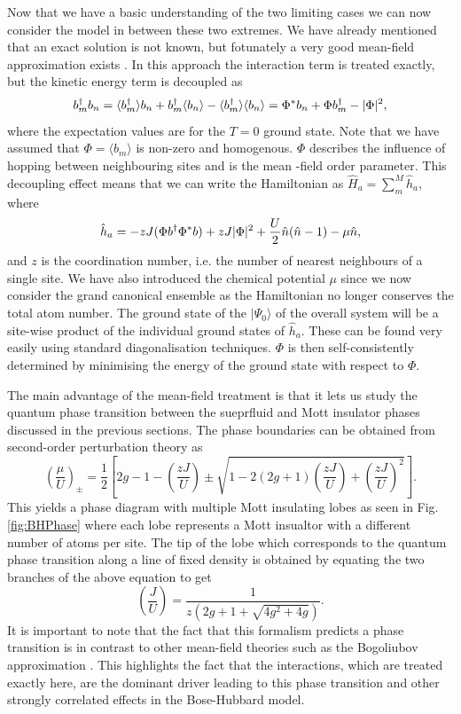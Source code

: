 Now that we have a basic understanding of the two limiting cases we
can now consider the model in between these two extremes. We have
already mentioned that an exact solution is not known, but fotunately
a very good mean-field approximation exists \cite{fisher1989}. In this
approach the interaction term is treated exactly, but the kinetic
energy term is decoupled as
\begin{equation}
  b^\dagger_m b_n = \langle b^\dagger_m \rangle b_n + b^\dagger_m \langle b_n \rangle -
  \langle b^\dagger_m \rangle \langle b_n \rangle = \Phi^* b_n + \Phi b^\dagger_m
  - | \Phi |^2,
\end{equation}
where the expectation values are for the $T = 0$ ground state. Note
that we have assumed that $\Phi = \langle b_m \rangle $ is non-zero
and homogenous. $\Phi$ describes the influence of hopping between
neighbouring sites and is the mean -field order parameter. This
decoupling effect means that we can write the Hamiltonian as $\hat{H}_a
= \sum_m^M \hat{h}_a$, where
\begin{equation}
  \hat{h}_a = -z J ( \Phi b^\dagger \Phi^* b) + z J | \Phi |^2 + \frac{U}{2}
  \hat{n} (\hat{n} - 1) - \mu \hat{n},
\end{equation}
and $z$ is the coordination number, i.e. the number of nearest
neighbours of a single site. We have also introduced the chemical
potential $\mu$ since we now consider the grand canonical ensemble as
the Hamiltonian no longer conserves the total atom number. The ground
state of the $| \Psi_0 \rangle$ of the overall system will be a
site-wise product of the individual ground states of
$\hat{h}_a$. These can be found very easily using standard
diagonalisation techniques. $\Phi$ is then self-consistently
determined by minimising the energy of the ground state with respect
to $\Phi$.

The main advantage of the mean-field treatment is that it lets us
study the quantum phase transition between the sueprfluid and Mott
insulator phases discussed in the previous sections. The phase
boundaries can be obtained from second-order perturbation theory as 
\begin{equation}
  \left( \frac{\mu} {U} \right)_\pm = \frac{1}{2} \left[ 2g - 1 -
    \left( \frac{zJ}{U} \right) \pm \sqrt{ 1 - 2 (2g + 1) \left( \frac{zJ}{U}
        \right) + \left( \frac{zJ}{U} \right)^2} \right].
\end{equation}
This yields a phase diagram with multiple Mott insulating lobes as
seen in Fig. \ref{fig:BHPhase} where each lobe represents a Mott insualtor with a
different number of atoms per site. The tip of the lobe which
corresponds to the quantum phase transition along a line of fixed
density is obtained by equating the two branches of the above equation
to get
\begin{equation}
  \left( \frac{J} {U} \right) = \frac{1} {z (2g + 1 + \sqrt{4g^2 + 4g} )}.
\end{equation}
It is important to note that the fact that this formalism predicts a
phase transition is in contrast to other mean-field theories such as
the Bogoliubov approximation \cite{PitaevskiiStringari}. This
highlights the fact that the interactions, which are treated exactly
here, are the dominant driver leading to this phase transition and
other strongly correlated effects in the Bose-Hubbard model.


